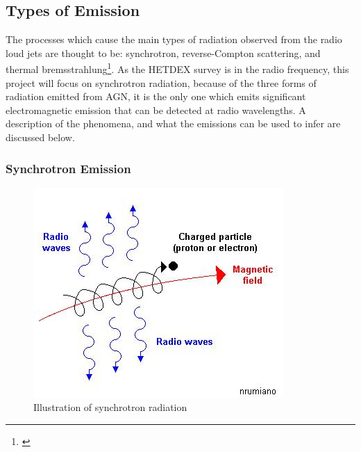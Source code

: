 \documentclass{article}
\begin{document}
\subsection{Types of Emission}

The processes which cause the main types of radiation observed from the radio loud jets are thought to be: synchrotron, reverse-Compton scattering, and thermal bremsstrahlung\footnote{\cite{Hardcastle}}. As the HETDEX survey is in the radio frequency, this project will focus on synchrotron radiation, because of the three forms of radiation emitted from AGN, it is the only one which emits significant electromagnetic emission that can be detected at radio wavelengths. A description of the phenomena, and what the emissions can be used to infer are discussed below.

\subsubsection{Synchrotron Emission}

\begin{figure}
\centering
\includegraphics[scale=0.7]{synchrotron_radiation.jpg}
\caption{Illustration of synchrotron radiation}
\label{fig:sr}
\end{figure}
\end{document}
